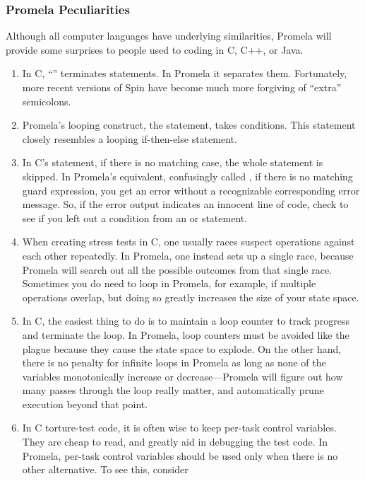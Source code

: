 \subsubsection{Promela Peculiarities}
\label{sec:formal:Promela Peculiarities}

Although all computer languages have underlying similarities,
Promela will provide some surprises to people used to coding in C,
C++, or Java.

\begin{enumerate}
\item	In C, ``\co{;}'' terminates statements.  In Promela it separates them.
	Fortunately, more recent versions of Spin have become
	much more forgiving of ``extra'' semicolons.
\item	Promela's looping construct, the  statement, takes
	conditions.
	This  statement closely resembles a looping if-then-else
	statement.
\item	In C's  statement, if there is no matching case, the whole
	statement is skipped.  In Promela's equivalent, confusingly called
	, if there is no matching guard expression, you get an error
	without a recognizable corresponding error message.
	So, if the error output indicates an innocent line of code,
	check to see if you left out a condition from an  or 
	statement.
\item	When creating stress tests in C, one usually races suspect operations
	against each other repeatedly.	In Promela, one instead sets up
	a single race, because Promela will search out all the possible
	outcomes from that single race.	Sometimes you do need to loop
	in Promela, for example, if multiple operations overlap, but
	doing so greatly increases the size of your state space.
\item	In C, the easiest thing to do is to maintain a loop counter to track
	progress and terminate the loop.  In Promela, loop counters
	must be avoided like the plague because they cause the state
	space to explode.  On the other hand, there is no penalty for
	infinite loops in Promela as long as none of the variables
	monotonically increase or decrease---Promela will figure out
	how many passes through the loop really matter, and automatically
	prune execution beyond that point.
\item	In C torture-test code, it is often wise to keep per-task control
	variables.  They are cheap to read, and greatly aid in debugging the
	test code.  In Promela, per-task control variables should be used
	only when there is no other alternative.  To see this, consider

\end{enumerate}
